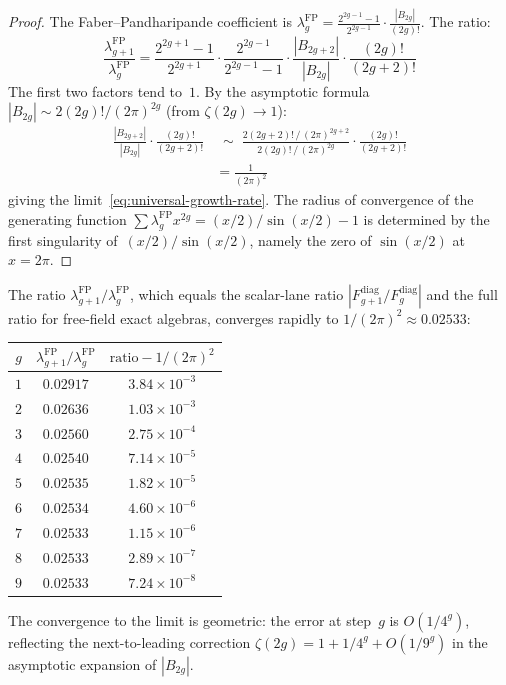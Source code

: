 \begin{proof}
The Faber--Pandharipande coefficient is
$\lambda_g^{\mathrm{FP}} = \frac{2^{2g-1}-1}{2^{2g-1}}
\cdot \frac{|B_{2g}|}{(2g)!}$. The ratio:
\[
\frac{\lambda_{g+1}^{\mathrm{FP}}}
{\lambda_g^{\mathrm{FP}}}
= \frac{2^{2g+1}-1}{2^{2g+1}} \cdot
\frac{2^{2g-1}}{2^{2g-1}-1} \cdot
\frac{|B_{2g+2}|}{|B_{2g}|} \cdot
\frac{(2g)!}{(2g+2)!}
\]
The first two factors tend to~$1$. By the asymptotic
formula $|B_{2g}| \sim 2(2g)!/(2\pi)^{2g}$
(from $\zeta(2g) \to 1$):
\begin{align*}
\frac{|B_{2g+2}|}{|B_{2g}|} \cdot
\frac{(2g)!}{(2g+2)!}
&\;\sim\;
\frac{2(2g{+}2)!\,/\,(2\pi)^{2g+2}}{2(2g)!\,/\,(2\pi)^{2g}}
\cdot \frac{(2g)!}{(2g{+}2)!}\\[3pt]
&= \frac{1}{(2\pi)^2}
\end{align*}
giving the limit~\eqref{eq:universal-growth-rate}.
The radius of convergence of the generating function
$\sum \lambda_g^{\mathrm{FP}} x^{2g} = (x/2)/\sin(x/2) - 1$
is determined by the first singularity
of~$(x/2)/\sin(x/2)$, namely the zero of
$\sin(x/2)$ at~$x = 2\pi$.
\end{proof}

\begin{computation}\label{comp:growth-ratios}

The ratio $\lambda_{g+1}^{\mathrm{FP}} /
\lambda_g^{\mathrm{FP}}$, which equals the scalar-lane ratio
$|F^{\mathrm{diag}}_{g+1}/F^{\mathrm{diag}}_g|$
and the full ratio for free-field exact algebras, converges rapidly to
$1/(2\pi)^2 \approx 0.02533$:

\medskip
\begin{center}
\renewcommand{\arraystretch}{1.3}
\begin{tabular}{ccc}
\toprule
$g$ & $\lambda_{g+1}^{\mathrm{FP}} /
\lambda_g^{\mathrm{FP}}$ & $\text{ratio} - 1/(2\pi)^2$ \\
\midrule
$1$ & $0.02917$ & $3.84 \times 10^{-3}$ \\
$2$ & $0.02636$ & $1.03 \times 10^{-3}$ \\
$3$ & $0.02560$ & $2.75 \times 10^{-4}$ \\
$4$ & $0.02540$ & $7.14 \times 10^{-5}$ \\
$5$ & $0.02535$ & $1.82 \times 10^{-5}$ \\
$6$ & $0.02534$ & $4.60 \times 10^{-6}$ \\
$7$ & $0.02533$ & $1.15 \times 10^{-6}$ \\
$8$ & $0.02533$ & $2.89 \times 10^{-7}$ \\
$9$ & $0.02533$ & $7.24 \times 10^{-8}$ \\
\bottomrule
\end{tabular}
\end{center}

\medskip
\noindent
The convergence to the limit is geometric: the error
at step~$g$ is $O(1/4^g)$, reflecting the next-to-leading
correction $\zeta(2g) = 1 + 1/4^g + O(1/9^g)$ in the
asymptotic expansion of $|B_{2g}|$.
\end{computation}

